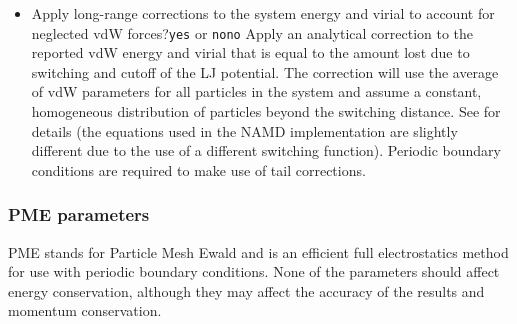 \begin{itemize}
\item
{}
{Apply long-range corrections to the system energy and virial to
account for neglected vdW forces?}{{\tt yes} or {\tt no}}{{\tt no}}
{Apply an analytical correction to the reported vdW energy and virial
that is equal to the amount lost due to switching and cutoff of the LJ
potential. The correction will use the average of vdW parameters for
all particles in the system and assume a constant, homogeneous
distribution of particles beyond the switching distance. See 
\cite{Shirts2007} for details (the equations used in the NAMD
implementation are slightly different due to the use of a different
switching function). Periodic boundary conditions are required to make
use of tail corrections.
}

\end{itemize}


\subsubsection{PME parameters}

PME stands for Particle Mesh Ewald and is an efficient
full electrostatics method for use with periodic boundary conditions.
None of the parameters should affect energy conservation, although they may affect the accuracy of the results and momentum conservation.

